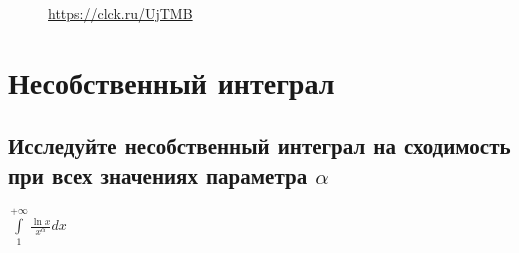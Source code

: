 \documentclass{article}
\begin{document}
\begin{figure}[h!]
\caption*{\url{https://clck.ru/UjTMB}}
\end{figure}
\newpage
\Large
\section{Несобственный интеграл}
\normalsize
\subsection{Исследуйте несобственный интеграл на сходимость при всех значениях параметра $ \alpha $}

\large $ \int\limits^{+\infty}_{1} \frac{\ln{x}}{x^{\alpha}}dx $\\
\normalsize
\end{document}
